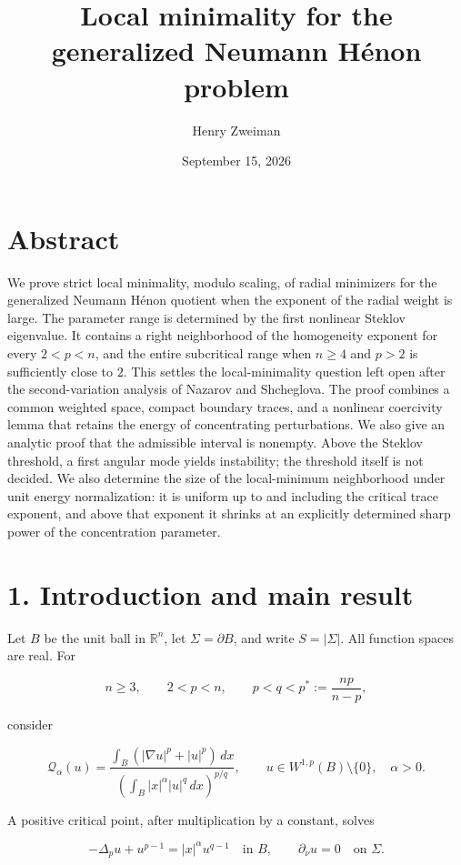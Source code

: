 \documentclass[11pt]{article}
\title{Local minimality for the generalized Neumann H\'enon problem}
\author{Henry Zweiman}
\date{September 15, 2026}
\begin{document}
\maketitle
{}\section{Abstract}\label{abstract}

We prove strict local minimality, modulo scaling, of radial minimizers
for the generalized Neumann Hénon quotient when the exponent of the
radial weight is large. The parameter range is determined by the first
nonlinear Steklov eigenvalue. It contains a right neighborhood of the
homogeneity exponent for every \(2<p<n\), and the entire subcritical
range when \(n\ge4\) and \(p>2\) is sufficiently close to \(2\). This
settles the local-minimality question left open after the
second-variation analysis of Nazarov and Shcheglova. The proof combines
a common weighted space, compact boundary traces, and a nonlinear
coercivity lemma that retains the energy of concentrating perturbations.
We also give an analytic proof that the admissible interval is nonempty.
Above the Steklov threshold, a first angular mode yields instability;
the threshold itself is not decided. We also determine the size of the
local-minimum neighborhood under unit energy normalization: it is
uniform up to and including the critical trace exponent, and above that
exponent it shrinks at an explicitly determined sharp power of the
concentration parameter.

\section{1. Introduction and main
result}\label{introduction-and-main-result}

Let \(B\) be the unit ball in \(\mathbb R^n\), let
\(\Sigma=\partial B\), and write \(S=|\Sigma|\). All function spaces are
real. For

\[
n\ge3,\qquad 2<p<n,\qquad p<q<p^*:=\frac{np}{n-p},
\]

consider

\[
\mathcal Q_\alpha(u)=
\frac{\displaystyle\int_B(|\nabla u|^p+|u|^p)\,dx}
{\displaystyle\left(\int_B |x|^\alpha|u|^q\,dx\right)^{p/q}},
\qquad u\in W^{1,p}(B)\setminus\{0\},\quad\alpha>0.
\tag{1}
\]

A positive critical point, after multiplication by a constant, solves

\[
-\Delta_p u+u^{p-1}=|x|^\alpha u^{q-1}\quad\text{in }B,
\qquad \partial_\nu u=0\quad\text{on }\Sigma.
\tag{2}
\]
\end{document}
